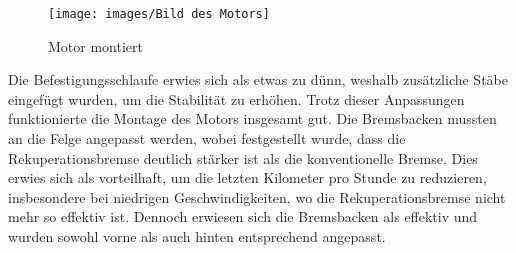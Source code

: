 \begin{figure}[h!]
    \centering
    \texttt{[image: images/Bild des Motors]}
    \caption{Motor montiert\cite{lorenz_scherrer_selbst_2023}}
    \label{fig:30}
\end{figure}


Die Befestigungsschlaufe erwies sich als etwas zu dünn, weshalb 
zusätzliche Stäbe eingefügt wurden, um die Stabilität zu erhöhen. 
Trotz 
dieser Anpassungen funktionierte die Montage des Motors insgesamt gut. 
Die Bremsbacken mussten an die Felge angepasst werden, wobei 
festgestellt wurde, dass die Rekuperationsbremse deutlich stärker ist 
als die konventionelle Bremse. 
Dies erwies sich als vorteilhaft, um die 
letzten Kilometer pro Stunde zu reduzieren, insbesondere bei niedrigen 
Geschwindigkeiten, wo die Rekuperationsbremse nicht mehr so effektiv 
ist. 
Dennoch erwiesen sich die Bremsbacken als effektiv und wurden 
sowohl vorne als auch hinten entsprechend angepasst.
